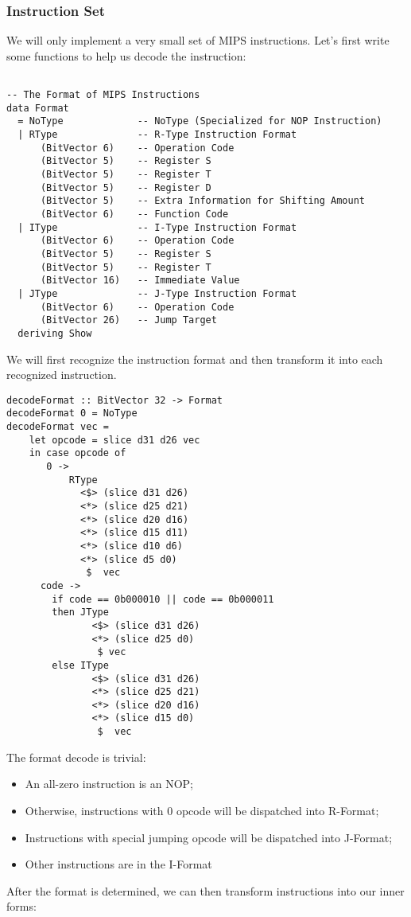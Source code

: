 \subsubsection{Instruction Set}
We will only implement a very small set of MIPS instructions. Let's first write some functions to help us decode the instruction:
\begin{verbatim}

-- The Format of MIPS Instructions
data Format            
  = NoType             -- NoType (Specialized for NOP Instruction)
  | RType              -- R-Type Instruction Format
      (BitVector 6)    -- Operation Code
      (BitVector 5)    -- Register S
      (BitVector 5)    -- Register T
      (BitVector 5)    -- Register D
      (BitVector 5)    -- Extra Information for Shifting Amount
      (BitVector 6)    -- Function Code
  | IType              -- I-Type Instruction Format
      (BitVector 6)    -- Operation Code
      (BitVector 5)    -- Register S
      (BitVector 5)    -- Register T
      (BitVector 16)   -- Immediate Value
  | JType              -- J-Type Instruction Format 
      (BitVector 6)    -- Operation Code
      (BitVector 26)   -- Jump Target
  deriving Show
\end{verbatim}
We will first recognize the instruction format and then transform it into each recognized instruction.
\begin{verbatim}
decodeFormat :: BitVector 32 -> Format
decodeFormat 0 = NoType
decodeFormat vec =
    let opcode = slice d31 d26 vec
    in case opcode of
       0 ->
           RType 
             <$> (slice d31 d26)
             <*> (slice d25 d21) 
             <*> (slice d20 d16) 
             <*> (slice d15 d11) 
             <*> (slice d10 d6) 
             <*> (slice d5 d0) 
              $  vec
      code -> 
        if code == 0b000010 || code == 0b000011
        then JType 
               <$> (slice d31 d26) 
               <*> (slice d25 d0) 
                $ vec
        else IType 
               <$> (slice d31 d26) 
               <*> (slice d25 d21) 
               <*> (slice d20 d16) 
               <*> (slice d15 d0) 
                $  vec
\end{verbatim}
The format decode is trivial:
\begin{itemize}
	\item An all-zero instruction is an NOP;
	\item Otherwise, instructions with 0 opcode will be dispatched into R-Format;
	\item Instructions with special jumping opcode will be dispatched into J-Format;
	\item Other instructions are in the I-Format
\end{itemize}
After the format is determined, we can then transform instructions into our inner forms:

